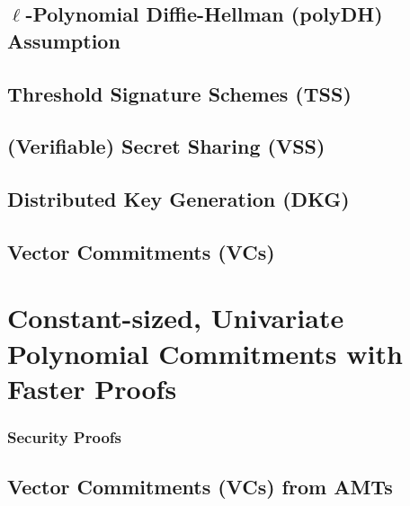 \documentclass[12pt,twoside,singlespace]{mitthesis}
\begin{document}
        \section{$\ell$-Polynomial Diffie-Hellman (polyDH) Assumption}
        \label{s:prelim:assumptions-threshold-crypto}
        

        \section{Threshold Signature Schemes (TSS)}
        \label{s:prelim:threshsig}
        
        
        \section{(Verifiable) Secret Sharing (VSS)}
        \label{s:prelim:vss}
        \label{s:prelim:shamir-secret-sharing}
        
        
        \section{Distributed Key Generation (DKG)}
        \label{s:prelim:dkg}
        
        
        \section{Vector Commitments (VCs)}
        \label{s:prelim:vcs}
        

    \chapter{Constant-sized, Univariate Polynomial Commitments with Faster Proofs}
    \label{s:amt}
        
        
        
            \subsection{Security Proofs}
            \label{s:amt:proofs}
            
    
        
        \section{Vector Commitments (VCs) from AMTs}
        \label{s:vcs:from-amt}
        
\end{document}
